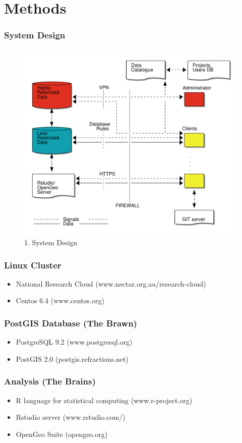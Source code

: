 \documentclass[bigger]{beamer}
\begin{document}
\section{Methods}
\label{sec-2}
\begin{frame}
\frametitle{System Design}
\label{sec-2-1}

\begin{figure}[!h]
\centering
\includegraphics[width=.65\textwidth]{opensoft.pdf}
\caption{1. System Design}
\label{fig:sys}
\end{figure}
\end{frame}
\begin{frame}
\frametitle{Linux Cluster}
\label{sec-2-2}

\begin{itemize}
\item National Research Cloud (www.nectar.org.au/research-cloud)
\item Centos 6.4 (www.centos.org)
\end{itemize}
\end{frame}
\begin{frame}
\frametitle{PostGIS Database (The Brawn)}
\label{sec-2-3}

\begin{itemize}
\item PostgreSQL 9.2 (www.postgresql.org)
\item PostGIS 2.0 (postgis.refractions.net)
\end{itemize} 
\end{frame}
\begin{frame}
\frametitle{Analysis (The Brains)}
\label{sec-2-4}

\begin{itemize}
\item R language for statistical computing (www.r-project.org)
\item Rstudio server (www.rstudio.com/)
\item OpenGeo Suite (opengeo.org)
\end{itemize}
\end{frame}
\end{document}
